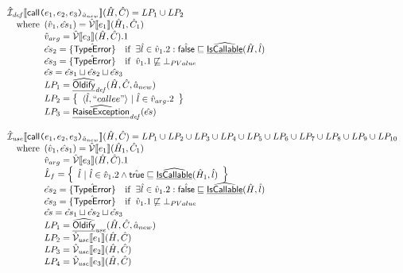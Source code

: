 \[
\begin{array}{l}
  \hat{\mathcal{I}}_{\it def}\llbracket \mbox{\textsf{call}}\mbox{\texttt{(}}e_1,e_2,e_3\mbox{\texttt{)}}_{\hat{a}_{new}} \rrbracket(\hat{H},\hat{C})
  = LP_1 \cup LP_2\\
  \quad{\rm where}\begin{array}[t]{l}
    (\hat{v}_1,\hat{es}_1) = \hat{\mathcal{V}}\llbracket e_1\rrbracket(\hat{H}_1,\hat{C}_1) \\
    \hat{v}_{arg} = \hat{\mathcal{V}}\llbracket e_3\rrbracket(\hat{H},\hat{C}).1 \\
    \hat{es}_2 = \{\hat{{\sf TypeError}}\} \quad{\rm if}\begin{array}[t]{l}\exists \hat{l}\in\hat{v}_1.2:\hat{\mbox{\textsf{false}}}\sqsubseteq\widehat{\underline{\sf IsCallable}}(\hat{H},\hat{l})\end{array}\\
    \hat{es}_3 = \{\hat{{\sf TypeError}}\} \quad{\rm if}\begin{array}[t]{l}\hat{v}_1.1\not\sqsubseteq\bot_{PValue}\end{array}\\
    \hat{es} = \hat{es}_1\sqcup\hat{es}_2\sqcup\hat{es}_3\\
    LP_1 = \widehat{\underline{\sf Oldify}}_{\it def}(\hat{H}, \hat{C}, \hat{a}_{new}) \\
    LP_2 = \left\{\begin{array}{l}\langle \hat{l}, ``callee"\rangle ~|~ \hat{l}\in \hat{v}_{arg}.2\end{array}\right\} \\
    LP_3 = \widehat{\underline{\sf RaiseException}}_{\it def}(\hat{es})
  \end{array}
  \\\\
  \hat{\mathcal{I}}_{\it use}\llbracket \mbox{\textsf{call}}\mbox{\texttt{(}}e_1,e_2,e_3\mbox{\texttt{)}}_{\hat{a}_{new}} \rrbracket(\hat{H},\hat{C})
  = LP_1 \cup LP_2 \cup LP_3 \cup LP_4 \cup LP_5 \cup LP_6 \cup LP_7 \cup LP_8 \cup LP_9\cup LP_{10}\\
  \quad{\rm where}\begin{array}[t]{l}
    (\hat{v}_1,\hat{es}_1) = \hat{\mathcal{V}}\llbracket e_1\rrbracket(\hat{H}_1,\hat{C}_1) \\
    \hat{v}_{arg} = \hat{\mathcal{V}}\llbracket e_3\rrbracket(\hat{H},\hat{C}).1 \\
    \hat{L}_f = \left\{\begin{array}{l} \hat{l} ~|~ \hat{l}\in \hat{v}_1.2 \land \hat{\mbox{\textsf{true}}}\sqsubseteq\widehat{\underline{\sf IsCallable}}(\hat{H}_1,\hat{l})\end{array}\right\} \\
    \hat{es}_2 = \{\hat{{\sf TypeError}}\} \quad{\rm if}\begin{array}[t]{l}\exists \hat{l}\in\hat{v}_1.2:\hat{\mbox{\textsf{false}}}\sqsubseteq\widehat{\underline{\sf IsCallable}}(\hat{H},\hat{l})\end{array}\\
    \hat{es}_3 = \{\hat{{\sf TypeError}}\} \quad{\rm if}\begin{array}[t]{l}\hat{v}_1.1\not\sqsubseteq\bot_{PValue}\end{array}\\
    \hat{es} = \hat{es}_1\sqcup\hat{es}_2\sqcup\hat{es}_3\\
    LP_1 = \widehat{\underline{\sf Oldify}}_{\it use}(\hat{H}, \hat{C}, \hat{a}_{new}) \\
    LP_2 = \hat{\mathcal{V}}_{\it use}\llbracket e_1\rrbracket(\hat{H},\hat{C})\\
    LP_3 = \hat{\mathcal{V}}_{\it use}\llbracket e_2\rrbracket(\hat{H},\hat{C})\\
    LP_4 = \hat{\mathcal{V}}_{\it use}\llbracket e_3\rrbracket(\hat{H},\hat{C})\\
\end{array}
\end{array}\]
